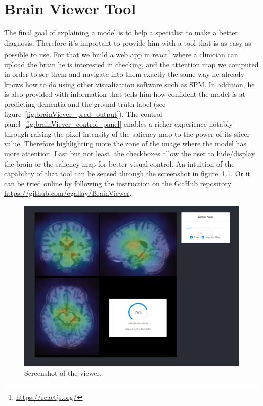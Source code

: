 \chapter{Brain Viewer Tool}
\label{chap:brainviewer}
The final goal of explaining a model is to help a specialist to make a better diagnosis. Therefore it's important to provide him with a tool that is as easy as possible to use. For that we build a web app in react\footnote{\href{https://reactjs.org/}{https://reactjs.org/}} where a clinician can upload the brain he is interested in checking, and the attention map we computed in order to see them and navigate into them exactly the same way he already knows how to do using other visualization software such as SPM\footnotemark{}. In addition, he is also provided with information that tells him how confident the model is at predicting dementia and the ground truth label (see figure~\ref{fig:brainViever_pred_output}). The control panel~\ref{fig:brainViever_control_panel} enables a richer experience notably through raising the pixel intensity of the saliency map to the power of its slicer value. Therefore highlighting more the zone of the image where the model has more attention. Last but not least, the checkboxes allow the user to hide/display the brain or the saliency map for better visual control. An intuition of the capability of that tool can be sensed through the screenshot in figure~\ref{fig:brain_viewer}. Or it can be tried online by following the instruction on the GitHub repository \href{https://github.com/cgallay/BrainViewer}{https://github.com/cgallay/BrainViewer}.

\begin{figure}
 \centering
 \includegraphics[width=.9\linewidth]{figures/BrainViewer/main.png}
 \captionsetup{width=.9\linewidth}
 \caption{Screenshot of the viewer.}
 \label{fig:brain_viewer}
\end{figure}

